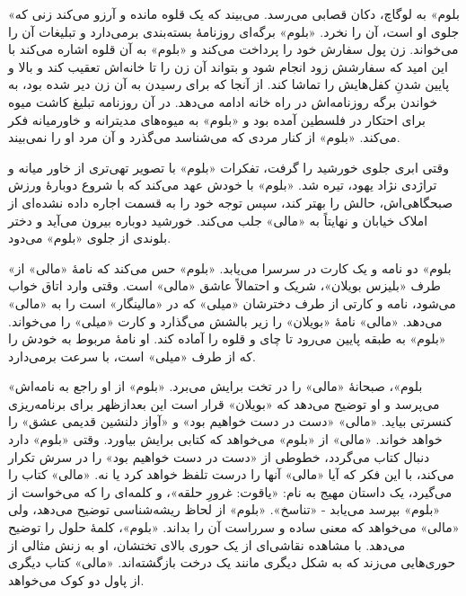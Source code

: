 \documentclass[12pt]{book}
\newcommand{\noun}[1]{«{#1}»}
\begin{document}
    \noun{بلوم} به لوگاچ، دکان قصابی می‌رسد. می‌بیند که یک قلوه مانده و آرزو می‌کند زنی که جلوی او است، آن را نخرد. \noun{بلوم} برگه‌ای روزنامۀ بسته‌بندی برمی‌دارد و تبلیغات آن را می‌خواند. زن پول سفارش خود را پرداخت می‌کند و \noun{بلوم} به آن قلوه اشاره می‌کند با این امید که سفارشش زود انجام شود و بتواند آن زن را تا خانه‌اش تعقیب کند و بالا و پایین شدنِ کفل‌هایش را تماشا کند. از آنجا که برای رسیدن به آن زن دیر شده بود، به خواندن برگه روزنامه‌اش در راه خانه ادامه می‌دهد. در آن روزنامه تبلیغ کاشت میوه برای احتکار در فلسطین آمده بود و \noun{بلوم} به میوه‌های مدیترانه و خاورمیانه فکر می‌کند. \noun{بلوم} از کنار مردی که می‌شناسد می‌گذرد و آن مرد او را نمی‌بیند.

    وقتی ابری جلوی خورشید را گرفت، تفکرات \noun{بلوم} با تصویر تهی‌تری از خاور میانه و تراژدی نژاد یهود، تیره شد. \noun{بلوم} با خودش عهد می‌کند که با شروع دوبارۀ ورزش صبحگاهی‌اش، حالش را بهتر کند، سپس توجه خود را به قسمت اجاره داده نشده‌ای از املاک خیابان و نهایتاً به \noun{مالی} جلب می‌کند. خورشید دوباره بیرون می‌آید و دختر بلوندی از جلوی \noun{بلوم} می‌دود.

    \noun{بلوم} دو نامه و یک کارت در سرسرا می‌یابد. \noun{بلوم} حس می‌کند که نامۀ \noun{مالی} از طرف \noun{بلیزس بویلان‬}، شریک و احتمالاً عاشق \noun{مالی} است. وقتی وارد اتاق خواب می‌شود، نامه و کارتی از طرف دخترشان \noun{میلی} که در \noun{مالینگار} است را به \noun{مالی} می‌دهد. \noun{مالی} نامۀ \noun{بویلان} را زیر بالشش می‌گذارد و کارت \noun{میلی} را می‌خواند. \noun{بلوم} به طبقه پایین می‌رود تا چای و قلوه را آماده کند. او نامۀ مربوط به خودش را که از طرف \noun{میلی} است، با سرعت برمی‌دارد.

    \noun{بلوم}، صبحانۀ \noun{مالی} را در تخت برایش می‌برد. \noun{بلوم} از او راجع به نامه‌اش می‌پرسد و او توضیح می‌دهد که \noun{بویلان} قرار است این بعدازظهر برای برنامه‌ریزی کنسرتی بیاید. \noun{مالی} «دست در دست خواهیم بود» و «آواز دلنشین قدیمی عشق» را خواهد خواند. \noun{مالی} از \noun{بلوم} می‌خواهد که کتابی برایش بیاورد. وقتی \noun{بلوم} دارد دنبال کتاب می‌گردد، خطوطی از «دست در دست خواهیم بود» را در سرش تکرار می‌کند، با این فکر که آیا \noun{مالی} آنها را درست تلفظ خواهد کرد یا نه. \noun{مالی} کتاب را می‌گیرد، یک داستان مهیج به نام: «یاقوت: غرورِ حلقه»، و کلمه‌ای را که می‌خواست از \noun{بلوم} بپرسد می‌یابد - «تناسخ». \noun{بلوم} از لحاظ ریشه‌شناسی توضیح می‌دهد، ولی \noun{مالی} می‌خواهد که معنی ساده و سرراست آن را بداند. \noun{بلوم}، کلمۀ حلول را توضیح می‌دهد. با مشاهده نقاشی‌ای از یک حوری بالای تختشان، او به زنش مثالی از حوری‌هایی می‌زند که به شکل دیگری مانند یک درخت بازگشته‌اند. \noun{مالی} کتاب دیگری از پاول دو کوک می‌خواهد.
\end{document}
